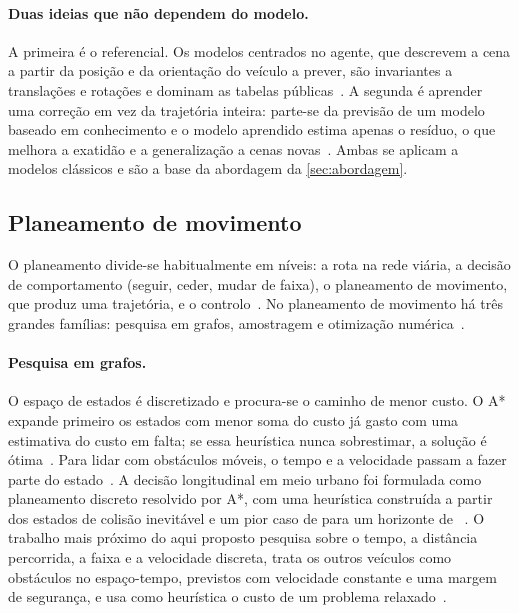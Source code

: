 \paragraph{Duas ideias que não dependem do modelo.}
A primeira é o referencial. Os modelos centrados no agente, que descrevem
a cena a partir da posição e da orientação do veículo a prever, são
invariantes a translações e rotações e dominam as tabelas
públicas~\cite{su2022narrowing,shi2022motion}. A segunda é aprender uma
correção em vez da trajetória inteira: parte-se da previsão de um modelo
baseado em conhecimento e o modelo aprendido estima apenas o resíduo, o
que melhora a exatidão e a generalização a cenas
novas~\cite{bahari2021injecting}. Ambas se aplicam a modelos clássicos e
são a base da abordagem da \cref{sec:abordagem}.

\subsection{Planeamento de movimento}
\label{sec:planeamento}

O planeamento divide-se habitualmente em níveis: a rota na rede viária, a
decisão de comportamento (seguir, ceder, mudar de faixa), o planeamento de
movimento, que produz uma trajetória, e o
controlo~\cite{paden2016survey}. No planeamento de movimento há três
grandes famílias: pesquisa em grafos, amostragem e otimização
numérica~\cite{paden2016survey}.

\paragraph{Pesquisa em grafos.}
O espaço de estados é discretizado e procura-se o caminho de menor custo.
O A* expande primeiro os estados com menor soma do custo já gasto com uma
estimativa do custo em falta; se essa heurística nunca sobrestimar, a
solução é ótima~\cite{hart1968formal}. Para lidar com obstáculos móveis, o
tempo e a velocidade passam a fazer parte do
estado~\cite{ziegler2009spatiotemporal}. A decisão longitudinal em meio
urbano foi formulada como planeamento discreto resolvido por A*, com uma
heurística construída a partir dos estados de colisão inevitável e um
pior caso de  para um horizonte de
~\cite{hubmann2016generic}. O trabalho mais próximo do aqui
proposto pesquisa sobre o tempo, a distância percorrida, a faixa e a
velocidade discreta, trata os outros veículos como obstáculos no
espaço-tempo, previstos com velocidade constante e uma margem de
segurança, e usa como heurística o custo de um problema
relaxado~\cite{ajanovic2018search}.

